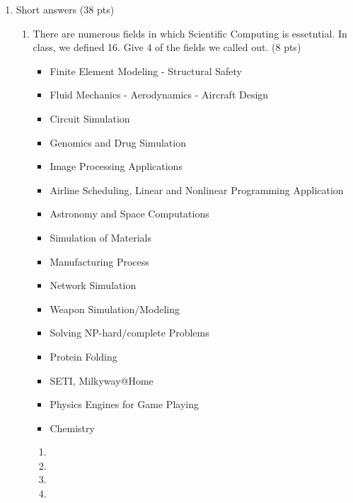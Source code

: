 \documentclass[10pt]{article}
\begin{document}
\begin{enumerate}

\item Short answers (38 pts)

    \begin{enumerate}
    \item There are numerous fields in which Scientific Computing is essetntial. In class, we defined 16.  Give 4 of the fields we called out. (8 pts)

    \beginanswers
        \begin{itemize}
        \item Finite Element Modeling - Structural Safety
        \item Fluid Mechanics - Aerodynamics - Aircraft Design
        \item Circuit Simulation
        \item Genomics and Drug Simulation
        \item Image Processing Applications
        \item Airline Scheduling, Linear and Nonlinear Programming Application
        \item Astronomy and Space Computations
        \item Simulation of Materials
        \item Manufacturing Process
        \item Network Simulation
        \item Weapon Simulation/Modeling
        \item Solving NP-hard/complete Problems
        \item Protein Folding
        \item SETI, Milkyway@Home
        \item Physics Engines for Game Playing
        \item Chemistry
        \end{itemize}
    \else
	\begin{enumerate}
	\item 
	\bigskip
	\bigskip
	\item
	\bigskip
	\bigskip
	\item 
	\bigskip
	\bigskip
	\item
	\bigskip
	\bigskip
        \end{enumerate}
    \fi
    \bigskip
    \bigskip


\end{enumerate}
\end{enumerate}
\end{document}
